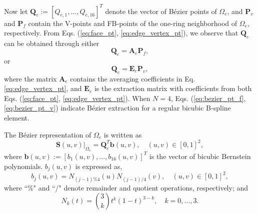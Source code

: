 \documentclass[graybox]{svmult}
\begin{document}
Now let $\bm{Q}_e:=[Q_{e,1},\ldots,Q_{e,16}]^T$ denote the vector of B\'{e}zier points of $\Omega_e$, and $\bm{P}_v$ and $\bm{P}_f$ contain the V-points and FB-points of the one-ring neighborhood of $\Omega_e$, respectively. From Eqs. (\ref{eq:face_pt}, \ref{eq:edge_vertex_pt}), we observe that $\bm{Q}_e$ can be obtained through either
\begin{equation}
\bm{Q}_e = \bm{A}_e \bm{P}_{f},
\label{eq:bezier_pt_f}
\end{equation}
or
\begin{equation}
\bm{Q}_e = \bm{E}_e \bm{P}_v,
\label{eq:bezier_pt_v}
\end{equation}
where the matrix $\bm{A}_e$ contains the averaging coefficients in Eq. \eqref{eq:edge_vertex_pt}, and $\bm{E}_e$ is the extraction matrix with coefficients from both Eqs. (\ref{eq:face_pt}, \ref{eq:edge_vertex_pt}). When $N=4$, Eqs. (\ref{eq:bezier_pt_f}, \ref{eq:bezier_pt_v}) indicate B\'{e}zier extraction for a regular bicubic B-spline element. 

The B\'{e}zier representation of $\Omega_e$ is written as
\begin{equation}
\bm{S}(u,v)|_{\Omega_e} = \bm{Q}_e^T \bm{b}(u,v), \quad (u,v) \in [0,1]^2,
\label{eq:bezier_rep}
\end{equation}
where $\bm{b}(u,v):=[b_1(u,v),\ldots, b_{16}(u,v)]^T$ is the vector of bicubic Bernstein polynomials. $b_j(u,v)$ is expressed as,
\begin{equation}
b_j(u,v) = N_{(j-1)\%4}(u) N_{(j-1)/4}(v), \quad (u,v) \in [0,1]^2,
\end{equation}
where ``$\%$" and ``/" denote remainder and quotient operations, respectively; and
\begin{equation}
N_k(t) = \binom{3}{k} t^k (1-t)^{3-k}, \quad k=0,\ldots,3.
\end{equation}
\end{document}
